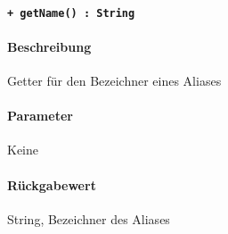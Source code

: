\paragraph{\texttt{+ getName() : String}}%
\paragraph*{Beschreibung}
Getter für den Bezeichner eines Aliases
\paragraph*{Parameter}
Keine
\paragraph*{Rückgabewert}
String, Bezeichner des Aliases